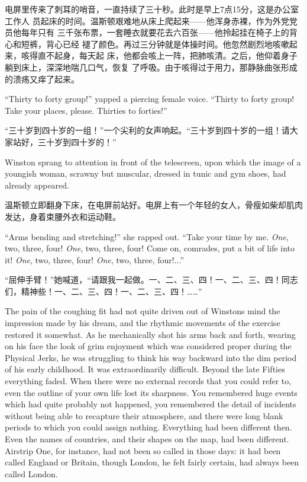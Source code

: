 \begin{paracol}{2}
\switchcolumn

电屏里传来了刺耳的哨音，一直持续了三十秒。此时是早上7点15分，这是办公室工作人
员起床的时间。温斯顿艰难地从床上爬起来——他浑身赤裸，作为外党党员他每年只有
三千张布票，一套睡衣就要花去六百张——他拎起挂在椅子上的背心和短裤，背心已经
褪了颜色。再过三分钟就是体操时间。他忽然剧烈地咳嗽起来，咳得直不起身，每天起
床，他都会咳上一阵，把肺咳清。之后，他仰着身子躺到床上，深深地喘几口气，恢复
了呼吸。由于咳得过于用力，那静脉曲张形成的溃疡又痒了起来。

\switchcolumn*

``Thirty to forty group!'' yapped a piercing female voice. ``Thirty to
forty group! Take your places, please. Thirties to forties!''

\switchcolumn

``三十岁到四十岁的一组！''一个尖利的女声响起。``三十岁到四十岁的一组！请大家站好，三十岁到四十岁的！''

\switchcolumn*

Winston sprang to attention in front of the telescreen, upon which the
image of a youngish woman, scrawny but muscular, dressed in tunic and
gym shoes, had already appeared.

\switchcolumn

温斯顿立即翻身下床，在电屏前站好。电屏上有一个年轻的女人，骨瘦如柴却肌肉发达，身着束腰外衣和运动鞋。

\switchcolumn*

``Arms bending and stretching!'' she rapped out. ``Take your time by me.
\emph{One}, two, three, four! \emph{One}, two, three, four! Come on,
comrades, put a bit of life into it! \emph{One}, two, three, four!
\emph{One}, two, three, four!...''

\switchcolumn

``屈伸手臂！''她喊道，``请跟我一起做。一、二、三、四！一、二、三、四！同志们，精神些！一、二、三、四！一、二、三、四！\ldots\ldots''

\switchcolumn*

The pain of the coughing fit had not quite driven out of
Winston\textquotesingle s mind the impression made by his dream, and the
rhythmic movements of the exercise restored it somewhat. As he
mechanically shot his arms back and forth, wearing on his face the look
of grim enjoyment which was considered proper during the Physical Jerks,
he was struggling to think his way backward into the dim period of his
early childhood. It was extraordinarily difficult. Beyond the late
Fifties everything faded. When there were no external records that you
could refer to, even the outline of your own life lost its sharpness.
You remembered huge events which had quite probably not happened, you
remembered the detail of incidents without being able to recapture their
atmosphere, and there were long blank periods to which you could assign
nothing. Everything had been different then. Even the names of
countries, and their shapes on the map, had been different. Airstrip
One, for instance, had not been so called in those days: it had been
called England or Britain, though London, he felt fairly certain, had
always been called London.


\end{paracol}
